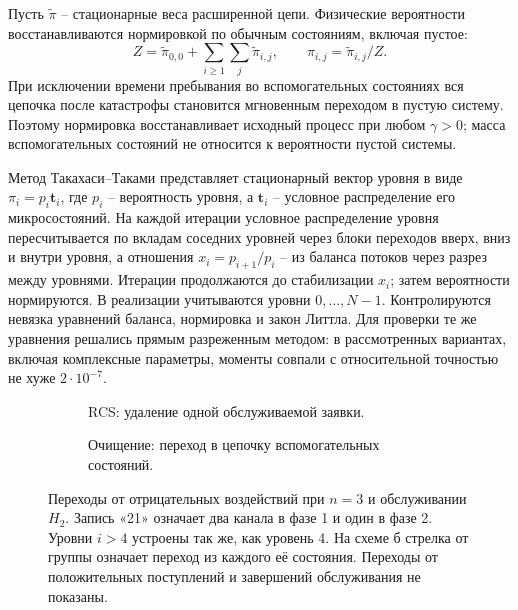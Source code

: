 Пусть \(\widetilde\pi\) -- стационарные веса расширенной цепи. Физические вероятности восстанавливаются нормировкой по обычным состояниям, включая пустое:
\[
Z=\widetilde\pi_{0,0}+\sum_{i\ge1}\sum_j\widetilde\pi_{i,j},\qquad
\pi_{i,j}=\widetilde\pi_{i,j}/Z.
\]
При исключении времени пребывания во вспомогательных состояниях вся цепочка после катастрофы становится мгновенным переходом в пустую систему. Поэтому нормировка восстанавливает исходный процесс при любом \(\gamma>0\); масса вспомогательных состояний не относится к вероятности пустой системы.

Метод Такахаси--Таками представляет стационарный вектор уровня в виде \(\pi_i=p_i\boldsymbol t_i\), где \(p_i\) -- вероятность уровня, а \(\boldsymbol t_i\) -- условное распределение его микросостояний. На каждой итерации условное распределение уровня пересчитывается по вкладам соседних уровней через блоки переходов вверх, вниз и внутри уровня, а отношения \(x_i=p_{i+1}/p_i\) -- из баланса потоков через разрез между уровнями. Итерации продолжаются до стабилизации \(x_i\); затем вероятности нормируются. В реализации учитываются уровни \(0,\ldots,N-1\). Контролируются невязка уравнений баланса, нормировка и закон Литтла. Для проверки те же уравнения решались прямым разреженным методом: в рассмотренных вариантах, включая комплексные параметры, моменты совпали с относительной точностью не хуже \(2\cdot10^{-7}\).

\begin{figure}[!htbp]
\centering
\begin{subfigure}[t]{0.98\linewidth}
\centering
{}
\caption{RCS: удаление одной обслуживаемой заявки.}
\label{fig:rcs_transitions}
\end{subfigure}

\begin{subfigure}[t]{0.98\linewidth}
\centering
{}
\caption{Очищение: переход в цепочку вспомогательных состояний.}
\label{fig:disaster_transitions}
\end{subfigure}
\caption{Переходы от отрицательных воздействий при \(n=3\) и обслуживании \(H_2\). Запись «21» означает два канала в фазе 1 и один в фазе 2. Уровни \(i>4\) устроены так же, как уровень 4. На схеме б стрелка от группы означает переход из каждого её состояния. Переходы от положительных поступлений и завершений обслуживания не показаны.}
\label{fig:negative_transitions}
\end{figure}

